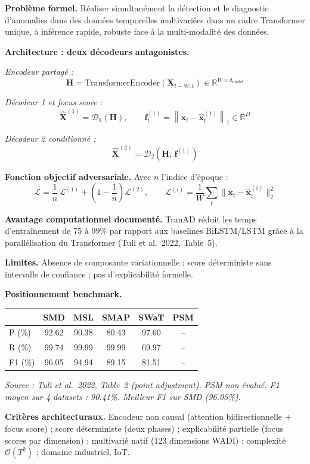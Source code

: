 \documentclass[12pt,a4paper]{article}
\newcommand{\nd}{--}
\begin{document}
\textbf{Problème formel.} Réaliser simultanément la détection et le diagnostic
d'anomalies dans des données temporelles multivariées dans un cadre Transformer
unique, à inférence rapide, robuste face à la multi-modalité des données.

\textbf{Architecture : deux décodeurs antagonistes.}

\textit{Encodeur partagé :}
$$\mathbf{H} = \mathrm{TransformerEncoder}(\mathbf{X}_{t-W:t})
\in \mathbb{R}^{W \times d_{\mathrm{model}}}$$

\textit{Décodeur 1 et focus score :}
$$\hat{\mathbf{X}}^{(1)} = \mathcal{D}_1(\mathbf{H}), \qquad
\mathbf{f}^{(1)}_t = \left\|\mathbf{x}_t -
\hat{\mathbf{x}}^{(1)}_t\right\|_1 \in \mathbb{R}^D$$

\textit{Décodeur 2 conditionné :}
$$\hat{\mathbf{X}}^{(2)} = \mathcal{D}_2(\mathbf{H},\,\mathbf{f}^{(1)})$$

\textbf{Fonction objectif adversariale.} Avec $n$ l'indice d'époque :
$$\mathcal{L} = \frac{1}{n}\,\mathcal{L}^{(1)} +
\left(1 - \frac{1}{n}\right)\mathcal{L}^{(2)},
\qquad \mathcal{L}^{(i)} = \frac{1}{W}\sum_t
\|\mathbf{x}_t - \hat{\mathbf{x}}^{(i)}_t\|_2^2$$

\textbf{Avantage computationnel documenté.} TranAD réduit les temps
d'entraînement de 75 à 99\% par rapport aux baselines BiLSTM/LSTM grâce à la
parallélisation du Transformer (Tuli et al.\ 2022, Table~5).

\textbf{Limites.} Absence de composante variationnelle ; score déterministe
sans intervalle de confiance ; pas d'explicabilité formelle.

\textbf{Positionnement benchmark.}

\smallskip
\begin{center}
\small
\begin{tabular}{lccccc}
\toprule
& SMD & MSL & SMAP & SWaT & PSM \\
\midrule
P (\%) & 92.62 & 90.38 & 80.43 & 97.60 & \nd \\
R (\%) & 99.74 & 99.99 & 99.99 & 69.97 & \nd \\
F1 (\%) & 96.05 & 94.94 & 89.15 & 81.51 & \nd \\
\bottomrule
\end{tabular}
\end{center}
\smallskip
\noindent\textit{\small Source : Tuli et al.\ 2022, Table~2 (point adjustment).
PSM non évalué. F1 moyen sur 4 datasets : 90.41\%. Meilleur F1 sur SMD (96.05\%).}

\textbf{Critères architecturaux.} Encodeur non causal (attention bidirectionnelle
+ focus score) ; score déterministe (deux phases) ; explicabilité partielle
(focus scores par dimension) ; multivarié natif (123 dimensions WADI) ;
complexité $\mathcal{O}(T^2)$ ; domaine industriel, IoT.
\end{document}
